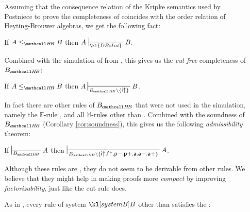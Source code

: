 Assuming that the consequence relation of the Kripke semantics used by Postniece
to prove the completeness of  coincides with the order relation of
Heyting-Brouwer algebras, we get the following fact:

\begin{fact}
  If $A \sementHB B$ then $A \prov{\kl{DBiInt}} B$.
\end{fact}

Combined with the simulation of  from ,
this gives us the \emph{cut-free} completeness of $\sysBHB$:

\begin{theorem}
  If $A \sementHB B$ then $A \prov{\sysBHB \setminus \{\rsf{i{\ua}}\}} B$.
\end{theorem}

In fact there are other rules of $\sysBHB$ that were not used in the simulation,
namely the $\mathbb{F}$-rule , and all $\mathbb{M}$-rules other
than . Combined with the soundness of $\sysBHB$ (Corollary
\ref{cor:soundness}), this gives us the following \emph{admissibility} theorem:

\begin{theorem}[Admissibility]

  If $\prov{\sysBHB} A$ then $\prov{\sysBHB \setminus
  \{\rsf{i{\ua}},\rsf{f{\ua}},\rsf{p{-}},\rsf{p{+}},\rsf{a},\rsf{a{-}},\rsf{a{+}}\}}
  A$.
\end{theorem}

Although these rules are , they do not seem to be derivable from other
rules. We believe that they might help in making proofs more \emph{compact} by
improving \emph{factorizability}, just like the cut rule does.

As in , every rule of system $\sysB$ other than
 satisfies the \emph{}:


